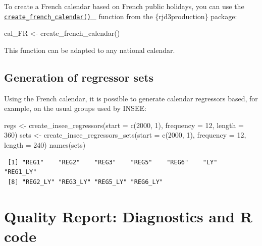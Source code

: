 \documentclass[
  letterpaper,
  DIV=11,
  numbers=noendperiod]{scrreprt}
\newenvironment{Shaded}{\begin{snugshade}}{\end{snugshade}}
\newcommand{\AttributeTok}[1]{\textcolor[rgb]{0.40,0.45,0.13}{#1}}
\newcommand{\DecValTok}[1]{\textcolor[rgb]{0.68,0.00,0.00}{#1}}
\newcommand{\FunctionTok}[1]{\textcolor[rgb]{0.28,0.35,0.67}{#1}}
\newcommand{\NormalTok}[1]{\textcolor[rgb]{0.00,0.23,0.31}{#1}}
\newcommand{\OtherTok}[1]{\textcolor[rgb]{0.00,0.23,0.31}{#1}}
\begin{document}
To create a French calendar based on French public holidays, you can use
the
\href{https://inseefr.github.io/rjd3production/reference/insee_modelling.html}{\texttt{create\_french\_calendar()}~🔗}
function from the \{rjd3production\} package:

\begin{Shaded}
\begin{Highlighting}[]
\NormalTok{cal\_FR }\OtherTok{\textless{}{-}} \FunctionTok{create\_french\_calendar}\NormalTok{()}
\end{Highlighting}
\end{Shaded}

This function can be adapted to any national calendar.

\hypertarget{generation-of-regressor-sets}{%
\subsection*{Generation of regressor
sets}\label{generation-of-regressor-sets}}

Using the French calendar, it is possible to generate calendar
regressors based, for example, on the usual groups used by INSEE:

\begin{Shaded}
\begin{Highlighting}[]
\NormalTok{regs }\OtherTok{\textless{}{-}} \FunctionTok{create\_insee\_regressors}\NormalTok{(}\AttributeTok{start =} \FunctionTok{c}\NormalTok{(}\DecValTok{2000}\NormalTok{, }\DecValTok{1}\NormalTok{), }\AttributeTok{frequency =} \DecValTok{12}\NormalTok{, }\AttributeTok{length =} \DecValTok{360}\NormalTok{)}
\NormalTok{sets }\OtherTok{\textless{}{-}} \FunctionTok{create\_insee\_regressors\_sets}\NormalTok{(}\AttributeTok{start =} \FunctionTok{c}\NormalTok{(}\DecValTok{2000}\NormalTok{, }\DecValTok{1}\NormalTok{), }\AttributeTok{frequency =} \DecValTok{12}\NormalTok{, }\AttributeTok{length =} \DecValTok{240}\NormalTok{)}
\FunctionTok{names}\NormalTok{(sets)}
\end{Highlighting}
\end{Shaded}

\begin{verbatim}
 [1] "REG1"    "REG2"    "REG3"    "REG5"    "REG6"    "LY"      "REG1_LY"
 [8] "REG2_LY" "REG3_LY" "REG5_LY" "REG6_LY"
\end{verbatim}

\hypertarget{ind-bq-r}{%
\section*{Quality Report: Diagnostics and R code}\label{ind-bq-r}}
\end{document}
